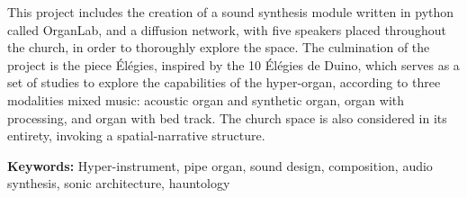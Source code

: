 \documentclass[12pt,twoside,maitrise]{dms_ks}
\newlength{\oldparskip}
\let\oldtableofcontents\tableofcontents  %
\renewcommand{\tableofcontents}{  %
    \begingroup
    \setlength{\parskip}{0pt}  %
    \oldtableofcontents  %
    \endgroup
    \setlength{\parskip}{\oldparskip}  %
}
\theoremstyle{definition}
\begin{document}
This project includes the creation of a sound synthesis module written in python called OrganLab, and a diffusion network, with five speakers placed throughout the church, in order to thoroughly explore the space. 
The culmination of the project is the piece Élégies, inspired by the 10 Élégies de Duino, which serves as a set of studies to explore the capabilities of the hyper-organ, according to three modalities mixed music: acoustic organ and synthetic organ, organ with processing, and organ with bed track. 
The church space is also considered in its entirety, invoking a spatial-narrative structure. 

\textbf{Keywords:} Hyper-instrument, pipe organ, sound design, composition, audio synthesis, sonic architecture, hauntology



\anglais
\cleardoublepage
{}  %
\anglais
\tableofcontents
\cleardoublepage
\anglais
\english
{}  %
\cleardoublepage
{}
\end{document}
